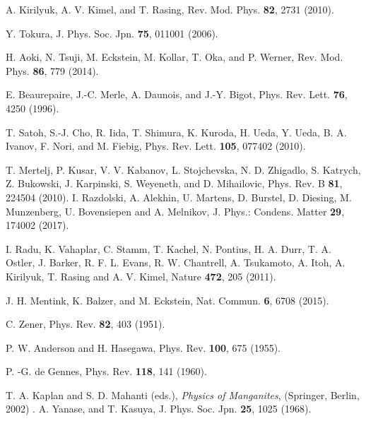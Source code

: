 \documentclass[aps,twocolumn,showpacs,prl,amsmath,amssymb]{revtex4-1}
\begin{document}
\begin{thebibliography}{99} 


A. Kirilyuk, A. V. Kimel, and T. Rasing, 
Rev. Mod. Phys. {\bf 82}, 2731 (2010). 

Y. Tokura, 
J. Phys. Soc. Jpn. {\bf 75}, 011001 (2006).

H. Aoki, N. Tsuji, M. Eckstein, M. Kollar, T. Oka, and P. Werner, 
Rev. Mod. Phys. {\bf 86}, 779 (2014).

E. Beaurepaire, J.-C. Merle, A. Daunois, and J.-Y. Bigot, 
Phys. Rev. Lett. {\bf 76}, 4250 (1996). 

T. Satoh, S.-J. Cho, R. Iida, T. Shimura, K. Kuroda, H. Ueda, Y. Ueda, B. A. Ivanov, F. Nori, and M. Fiebig, 
Phys. Rev. Lett. {\bf 105}, 077402 (2010).

T. Mertelj, P. Kusar, V. V. Kabanov, L. Stojchevska, N. D. Zhigadlo, S. Katrych, Z. Bukowski, J. Karpinski, S. Weyeneth, and D. Mihailovic, 
Phys. Rev. B {\bf 81}, 224504 (2010). 
I. Razdolski, A. Alekhin, U. Martens, D. Burstel, D. Diesing, M. Munzenberg, U. Bovensiepen and A. Melnikov, 
J. Phys.: Condens. Matter {\bf 29}, 174002 (2017). 

I. Radu, K. Vahaplar, C. Stamm, T. Kachel, N. Pontius, H. A. Durr, T. A. Ostler, J. Barker, R. F. L. Evans, R. W. Chantrell, A. Tsukamoto, A. Itoh, A. Kirilyuk, T. Rasing and A. V. Kimel,
Nature {\bf 472}, 205 (2011). 

J. H. Mentink, K. Balzer, and M. Eckstein, 
Nat. Commun. {\bf 6}, 6708 (2015). 

C. Zener, 
Phys. Rev. {\bf 82}, 403 (1951).

P. W. Anderson and H. Hasegawa, 
Phys. Rev. {\bf 100}, 675 (1955).

P. -G. de Gennes, 
Phys. Rev. {\bf 118}, 141 (1960). 


T. A. Kaplan and S. D. Mahanti (eds.),
{\it Physics of Manganites}, 
(Springer, Berlin, 2002) .
%
A. Yanase, and T. Kasuya, 
J. Phys. Soc. Jpn. {\bf 25}, 1025 (1968). 


\end{thebibliography}
\end{document}
